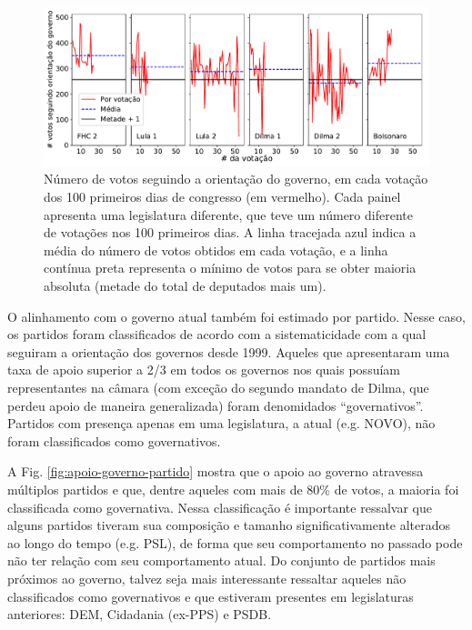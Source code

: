 \documentclass[12pt,a4paper]{article}
\begin{document}
\begin{figure}[t]
\centering
\includegraphics[width=1.0\textwidth]{graficos/apoio_ao_governo_por_votacao_2019-04-30.pdf}
\caption{Número de votos seguindo a orientação do governo, em cada votação dos 100 primeiros
  dias de congresso (em vermelho). Cada painel apresenta uma legislatura diferente, que teve
  um número diferente de votações nos 100 primeiros dias. A linha tracejada azul indica a média
  do número de votos obtidos em cada votação, e a linha contínua preta representa o mínimo de
  votos para se obter maioria absoluta (metade do total de deputados mais um).}
\label{fig:apoio-governo-votacao}
\end{figure} 

O alinhamento com o governo atual também foi estimado por partido. Nesse caso, os
partidos foram classificados de acordo com a sistematicidade com a qual seguiram
a orientação dos governos desde 1999. Aqueles que apresentaram uma taxa de apoio
superior a 2/3 em todos os governos nos quais possuíam representantes na câmara
(com exceção do segundo mandato de Dilma, que perdeu apoio de maneira generalizada) foram
denomidados ``governativos''. Partidos com presença apenas em uma legislatura, a atual (e.g. NOVO),
não foram classificados como governativos. 

A Fig. \ref{fig:apoio-governo-partido} mostra que o apoio ao governo atravessa múltiplos partidos e que,
dentre aqueles com mais de 80\% de votos, a maioria foi classificada como governativa. Nessa classificação
é importante ressalvar que alguns partidos tiveram sua composição e tamanho significativamente alterados ao longo
do tempo (e.g. PSL), de forma que seu comportamento no passado pode não ter relação com seu
comportamento atual. Do conjunto de partidos mais próximos ao governo, talvez seja mais interessante ressaltar aqueles
não classificados como governativos e que estiveram presentes em legislaturas anteriores: DEM, Cidadania (ex-PPS) e PSDB.
\end{document}
